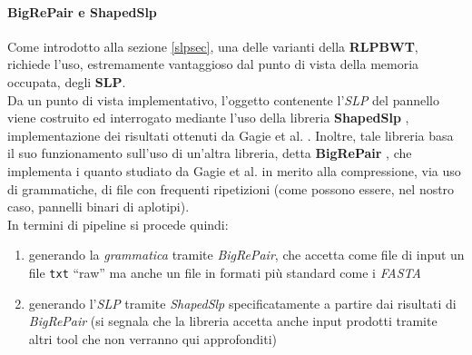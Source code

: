 \paragraph{BigRePair e ShapedSlp}
\label{subslp}
Come introdotto alla sezione \ref{slpsec}, una delle varianti della
\textbf{RLPBWT}, richiede l'uso, estremamente vantaggioso dal punto di vista
della memoria occupata, degli \textbf{SLP}.\\
Da un punto di vista implementativo, l'oggetto contenente l'\textit{SLP} del
pannello viene costruito ed interrogato mediante l'uso della libreria
\textbf{ShapedSlp} \cite{shapedslp}, implementazione dei risultati ottenuti da
Gagie et al. \cite{slpgagie}. Inoltre, tale libreria basa il suo funzionamento
sull'uso di un'altra libreria, detta \textbf{BigRePair} \cite{bigrepair}, che
implementa i quanto studiato da Gagie et al. \cite{rpair} in merito alla
compressione, via uso di grammatiche, di file con frequenti ripetizioni (come
possono essere, nel nostro caso, pannelli binari di aplotipi).\\
In termini di pipeline si procede quindi:
\begin{enumerate}
  \item generando la \textit{grammatica} tramite \textit{BigRePair}, che accetta
  come file di input un file \texttt{txt} ``raw'' ma anche un file in formati
  più standard come i \textit{FASTA}
  \item generando l'\textit{SLP} tramite \textit{ShapedSlp} specificatamente a
  partire dai risultati di \textit{BigRePair} (si segnala che la libreria
  accetta anche input prodotti tramite altri tool che non verranno qui
  approfonditi) 
\end{enumerate}
